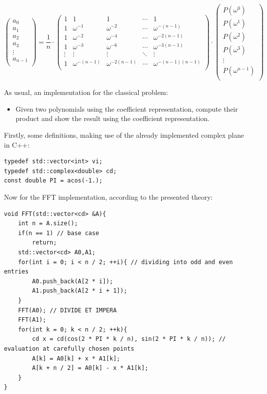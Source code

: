 \documentclass[letterpaper]{article}
\begin{document}
$$
 \begin{pmatrix}
 a_{0} \\
 a_{1} \\
 a_{2} \\
 a_{3} \\
 \vdots \\
 a_{n - 1} \\
 \end{pmatrix}
 =
 \frac{1}{n}
 \cdot
  \begin{pmatrix}
   1 & 1 & 1 &\cdots & 1 \\
   1 & \omega^{-1} & \omega^{-2} &\cdots & \omega^{-(n - 1)} \\
   1 & \omega^{-2} & \omega^{-4} &\cdots & \omega^{-2(n - 1)} \\
   1 & \omega^{-3} & \omega^{-6} &\cdots & \omega^{-3(n - 1)} \\
   \vdots  & \vdots  & \vdots & \ddots  & \vdots \\
   1 & \omega^{-(n-1)} & \omega^{-2(n - 1)} &\cdots & \omega^{-(n-1)(n-1)} \\
 \end{pmatrix}
 \cdot
 \begin{pmatrix}
 P(\omega^0) \\
 P(\omega^1) \\
 P(\omega^2) \\
 P(\omega^3) \\
 \vdots \\
 P(\omega^{n - 1}) \\
 \end{pmatrix}
$$

As usual, an implementation for the classical problem:

\begin{itemize}
    \item Given two polynomials using the coefficient representation, compute their product and show the result using the coefficient representation.
\end{itemize}

Firstly, some definitions, making use of the already implemented complex plane in C++:

\begin{lstlisting}
typedef std::vector<int> vi;
typedef std::complex<double> cd;
const double PI = acos(-1.);
\end{lstlisting}

Now for the FFT implementation, according to the presented theory:

\begin{lstlisting}
void FFT(std::vector<cd> &A){
    int n = A.size();
    if(n == 1) // base case
        return;
    std::vector<cd> A0,A1;
    for(int i = 0; i < n / 2; ++i){ // dividing into odd and even entries
        A0.push_back(A[2 * i]);
        A1.push_back(A[2 * i + 1]);
    }
    FFT(A0); // DIVIDE ET IMPERA
    FFT(A1);
    for(int k = 0; k < n / 2; ++k){
        cd x = cd(cos(2 * PI * k / n), sin(2 * PI * k / n)); // evaluation at carefully chosen points
        A[k] = A0[k] + x * A1[k];
        A[k + n / 2] = A0[k] - x * A1[k];
    }
}
\end{lstlisting}
\end{document}
